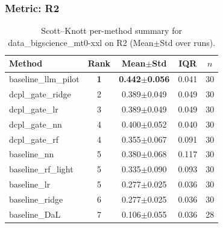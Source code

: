 \subsubsection*{Metric: R2}
\begin{table}[H]
\centering
\scriptsize
\setlength{\tabcolsep}{4pt}
\renewcommand{\arraystretch}{1.1}
\caption{Scott--Knott per-method summary for data\_bigscience\_mt0-xxl on R2 (Mean$\pm$Std over runs).}
\label{tab:sk_data_bigscience_mt0-xxl_R2}
\begin{tabular}{l|c|c|c|c}
\hline
\textbf{Method} & \textbf{Rank} & \textbf{Mean$\pm$Std} & \textbf{IQR} & \textbf{$n$} \\
\hline
\rowcolor{red!15} baseline\_llm\_pilot & \textbf{1} & \textbf{0.442$\pm$0.056} & 0.041 & 30 \\
dcpl\_gate\_ridge & 2 & 0.389$\pm$0.049 & 0.049 & 30 \\
dcpl\_gate\_lr & 3 & 0.389$\pm$0.049 & 0.049 & 30 \\
dcpl\_gate\_nn & 4 & 0.400$\pm$0.052 & 0.040 & 30 \\
dcpl\_gate\_rf & 4 & 0.355$\pm$0.067 & 0.091 & 30 \\
baseline\_nn & 5 & 0.380$\pm$0.068 & 0.117 & 30 \\
baseline\_rf\_light & 5 & 0.335$\pm$0.090 & 0.093 & 30 \\
baseline\_lr & 5 & 0.277$\pm$0.025 & 0.036 & 30 \\
baseline\_ridge & 6 & 0.277$\pm$0.025 & 0.036 & 30 \\
baseline\_DaL & 7 & 0.106$\pm$0.055 & 0.036 & 28 \\
\hline
\end{tabular}
\end{table}

